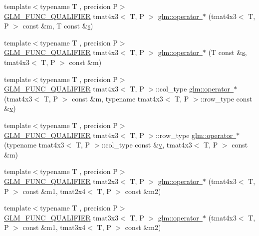\begin{DoxyCompactItemize}
\item 
{\footnotesize template$<$typename T , precision P$>$ }\\\mbox{\hyperlink{setup_8hpp_a33fdea6f91c5f834105f7415e2a64407}{G\+L\+M\+\_\+\+F\+U\+N\+C\+\_\+\+Q\+U\+A\+L\+I\+F\+I\+ER}} tmat4x3$<$ T, P $>$ \mbox{\hyperlink{namespaceglm_a68347c84bd777eea9ee8fd045d075ccd}{glm\+::operator $\ast$}} (tmat4x3$<$ T, P $>$ const \&m, T const \&\mbox{\hyperlink{glad_8h_af1b1d5edfea6a34daee7389b1b5810ad}{s}})
\item 
{\footnotesize template$<$typename T , precision P$>$ }\\\mbox{\hyperlink{setup_8hpp_a33fdea6f91c5f834105f7415e2a64407}{G\+L\+M\+\_\+\+F\+U\+N\+C\+\_\+\+Q\+U\+A\+L\+I\+F\+I\+ER}} tmat4x3$<$ T, P $>$ \mbox{\hyperlink{namespaceglm_aeed43edd02eaa661a88ac8e2ccc21e13}{glm\+::operator $\ast$}} (T const \&\mbox{\hyperlink{glad_8h_af1b1d5edfea6a34daee7389b1b5810ad}{s}}, tmat4x3$<$ T, P $>$ const \&m)
\item 
{\footnotesize template$<$typename T , precision P$>$ }\\\mbox{\hyperlink{setup_8hpp_a33fdea6f91c5f834105f7415e2a64407}{G\+L\+M\+\_\+\+F\+U\+N\+C\+\_\+\+Q\+U\+A\+L\+I\+F\+I\+ER}} tmat4x3$<$ T, P $>$\+::col\+\_\+type \mbox{\hyperlink{namespaceglm_a606d50bd4692f38919bb5d49b34aa5e2}{glm\+::operator $\ast$}} (tmat4x3$<$ T, P $>$ const \&m, typename tmat4x3$<$ T, P $>$\+::row\+\_\+type const \&\mbox{\hyperlink{glad_8h_a14cfbe2fc2234f5504618905b69d1e06}{v}})
\item 
{\footnotesize template$<$typename T , precision P$>$ }\\\mbox{\hyperlink{setup_8hpp_a33fdea6f91c5f834105f7415e2a64407}{G\+L\+M\+\_\+\+F\+U\+N\+C\+\_\+\+Q\+U\+A\+L\+I\+F\+I\+ER}} tmat4x3$<$ T, P $>$\+::row\+\_\+type \mbox{\hyperlink{namespaceglm_ad19c33d95088c13f86db27ee3bdb6fff}{glm\+::operator $\ast$}} (typename tmat4x3$<$ T, P $>$\+::col\+\_\+type const \&\mbox{\hyperlink{glad_8h_a14cfbe2fc2234f5504618905b69d1e06}{v}}, tmat4x3$<$ T, P $>$ const \&m)
\item 
{\footnotesize template$<$typename T , precision P$>$ }\\\mbox{\hyperlink{setup_8hpp_a33fdea6f91c5f834105f7415e2a64407}{G\+L\+M\+\_\+\+F\+U\+N\+C\+\_\+\+Q\+U\+A\+L\+I\+F\+I\+ER}} tmat2x3$<$ T, P $>$ \mbox{\hyperlink{namespaceglm_accdeece6c86a9755cb501982e7c87809}{glm\+::operator $\ast$}} (tmat4x3$<$ T, P $>$ const \&m1, tmat2x4$<$ T, P $>$ const \&m2)
\item 
{\footnotesize template$<$typename T , precision P$>$ }\\\mbox{\hyperlink{setup_8hpp_a33fdea6f91c5f834105f7415e2a64407}{G\+L\+M\+\_\+\+F\+U\+N\+C\+\_\+\+Q\+U\+A\+L\+I\+F\+I\+ER}} tmat3x3$<$ T, P $>$ \mbox{\hyperlink{namespaceglm_a0b634d3ac6f3e670d0b9340b1b3409f5}{glm\+::operator $\ast$}} (tmat4x3$<$ T, P $>$ const \&m1, tmat3x4$<$ T, P $>$ const \&m2)

\end{DoxyCompactItemize}
